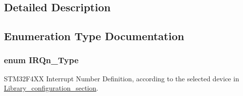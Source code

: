 \subsection{Detailed Description}


\subsection{Enumeration Type Documentation}
\subsubsection[{\texorpdfstring{I\+R\+Qn\+\_\+\+Type}{IRQn_Type}}]{\setlength{\rightskip}{0pt plus 5cm}enum {\bf I\+R\+Qn\+\_\+\+Type}}\hypertarget{group___peripheral__interrupt__number__definition_ga7e1129cd8a196f4284d41db3e82ad5c8}{}\label{group___peripheral__interrupt__number__definition_ga7e1129cd8a196f4284d41db3e82ad5c8}


S\+T\+M32\+F4\+XX Interrupt Number Definition, according to the selected device in \hyperlink{group___library__configuration__section}{Library\+\_\+configuration\+\_\+section}. 


